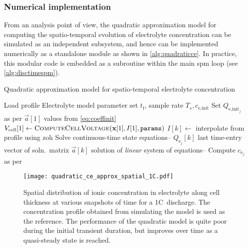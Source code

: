 \subsubsection*{Numerical implementation}
From an analysis point of view,  the quadratic approximation model for computing
the  spatio-temporal evolution  of  electrolyte concentration  can be  simulated
as  an  independent subsystem,  and  hence  can  be implemented  numerically  as
a  standalone  module as  shown  in  \cref{alg:quadraticce}. In  practice,  this
modular code  is embedded as  a subroutine within  the main \gls{spm}  loop (see
\cref{alg:disctimespm}).

\begin{algorithm}[!htbp]
    \caption{Quadratic approximation model for spatio-temporal electrolyte concentration}\label{alg:quadraticce}
    \begin{algorithmic}[1]
        \Require Load profile 
        \Require Electrolyte model parameter set  
        \Userdata $ t_\text{f}$,  sample rate $T_s, c_\text{e,init}$
        \State Set $Q_{\text{e,init}_j}$ as per 
        \State $\vec{a}[1]$ \gets values from \cref{eq:coeffinit}
        \State $V_\text{cell}[1] \gets \textsc{ComputeCellVoltage}(\textbf{x}[1],I[1],\texttt{params})$ 
        \State $I[k] \gets $ interpolate from profile using \gls{zoh}
        \State Solve continuous-time state equations-- 
        \State $Q_{\text{e}_j}[k]$ \gets last time-entry  vector of soln.\  matrix 
        \State $\vec{a}[k]$ \gets solution of \emph{linear} system of equations-- 
        \State Compute $c_{\text{e}_j}$ as per  
        \EndFor
        \EndFunction
    \end{algorithmic}
\end{algorithm}

\begin{figure}[!htb]
    \centering
    \texttt{[image: quadratic\_ce\_approx\_spatial\_1C.pdf]}
    \caption[Spatial distribution of electrolyte concentration for 1C~discharge]{Spatial distribution of ionic concentration in electrolyte along
        cell thickness at various snapshots of time for a 1C~discharge. The
        concentration profile obtained from simulating the 
        model is used as the reference. The performance of the quadratic model
        is quite poor during the initial transient duration, but improves over
    time as a quasi-steady state is reached.}
    \label{fig:spatialionicconc1C}
\end{figure}

